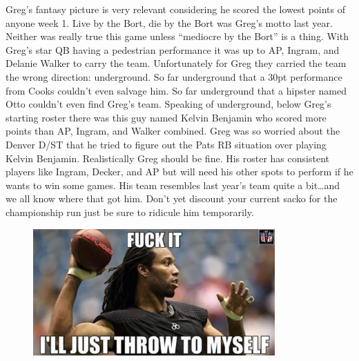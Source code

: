 \documentclass[11pt,letterpaper]{article}
\begin{document}
\newpage
{}
\par\noindent Greg's fantasy picture is very relevant considering he scored the lowest points of anyone week 1. Live by the Bort, die by the Bort was Greg's motto last year. Neither was really true this game unless ``mediocre by the Bort'' is a thing. With Greg's star QB having a pedestrian performance it was up to AP, Ingram, and Delanie Walker to carry the team. Unfortunately for Greg they carried the team the wrong direction: underground. So far underground that a 30pt performance from Cooks couldn't even salvage him. So far underground that a hipster named Otto couldn't even find Greg's team. Speaking of underground, below Greg's starting roster there was this guy named Kelvin Benjamin who scored more points than AP, Ingram, and Walker combined. Greg was so worried about the Denver D/ST that he tried to figure out the Pats RB situation over playing Kelvin Benjamin. Realistically Greg should be fine. His roster has consistent players like Ingram, Decker, and AP but will need his other spots to perform if he wants to win some games. His team resembles last year's team quite a bit\dots and we all know where that got him. Don't yet discount your current sacko for the championship run just be sure to ridicule him temporarily. 
\begin{figure}
\centering
\includegraphics[width=0.825\textwidth]{week1-larry.png}
\label{fig:week1-larry}
\end{figure} 
\bigskip
\end{document}
